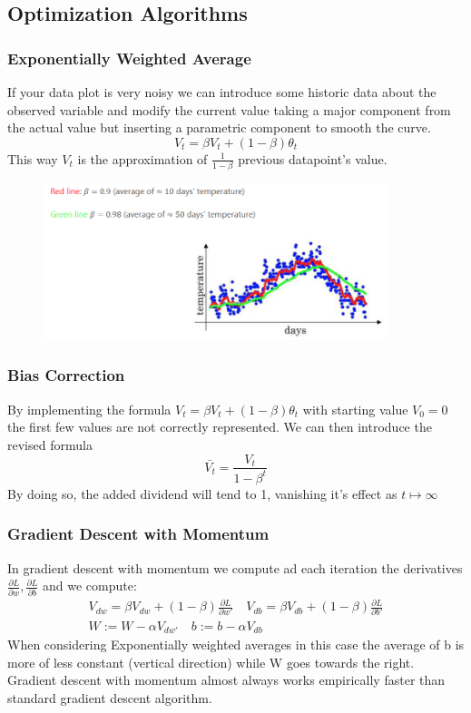 \documentclass{article}
\begin{document}
\subsection{Optimization Algorithms}
\subsubsection{Exponentially Weighted Average}
If your data plot is very noisy we can introduce some historic data about the observed variable and modify the current value taking a major component from the actual value but inserting a parametric component to smooth the curve.
\[ 
    V_t = \beta V_t+(1-\beta)\theta_t 
\]This way $V_t$ is the approximation of $\frac{1}{1-\beta}$ previous datapoint's value.
\begin{figure}[htbp]
    \centering
    \includegraphics[width=10cm]{weighted_average.png}
\end{figure}
\subsubsection*{Bias Correction}
By implementing the formula $V_t = \beta V_t+(1-\beta)\theta_t $ with starting value $V_0 = 0$ the first few values are not correctly represented. We can then introduce the revised formula
\[ 
    \bar{V_t} = \frac{V_t}{1-\beta^t} 
\]By doing so, the added dividend will tend to 1, vanishing it's effect as $t \mapsto \infty$
\subsubsection*{Gradient Descent with Momentum}
In gradient descent with momentum we compute ad each iteration the derivatives $\frac{\partial L }{\partial w}, \frac{\partial L }{\partial b}$ and we compute:
\begin{align*}
    V_{dw}=\beta V_{dw}+(1-\beta)\frac{\partial L}{\partial w'} \quad V_{db}=\beta V_{db}+(1-\beta)\frac{\partial L}{\partial b'} \\
    W:= W - \alpha V_{dw'}\quad b:= b-\alpha V_{db}
\end{align*}
When considering Exponentially weighted averages in this case the average of b is more of less constant (vertical direction) while W goes towards the right. 
Gradient descent with momentum almost always works empirically  faster than standard gradient descent algorithm. 
\end{document}
